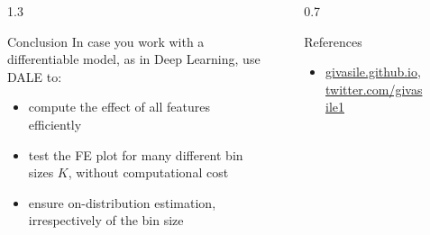 \documentclass[final]{beamer}
\newlength{\sepwidth}
\newlength{\colwidth}
\newcommand{\separatorcolumn}{\begin{column}{\sepwidth}\end{column}}
\begin{document}
\begin{frame}[t]
\begin{columns}[t]\separatorcolumn
    \begin{column}{1.3\colwidth}
      \large
      \begin{alertblock}{Conclusion} In case you work with a
        differentiable model, as in Deep Learning, use DALE to:
        \begin{itemize}
        \item compute the effect of all features efficiently
        \item test the FE plot for many different bin sizes \(K\), without computational cost
        \item ensure on-distribution estimation, irrespectively of the bin size
      \end{itemize}
    \end{alertblock}
	\end{column} \separatorcolumn
	\begin{column}{0.7\colwidth}
    \begin{block}{References}
      \printbibliography[heading=none]
      \begin{itemize}
      \item \large \href{givasile.github.io}{givasile.github.io}, \href{https://twitter.com/givasile1}{twitter.com/givasile1}
      \end{itemize}
      
	\end{block}
\end{column}
\separatorcolumn
\end{columns}


\end{frame}
\end{document}
